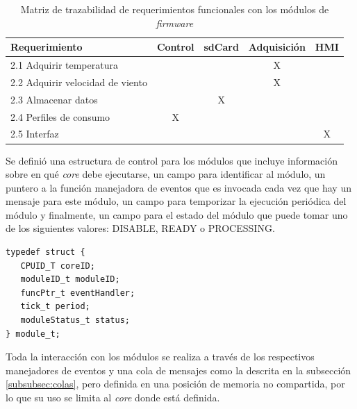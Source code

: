 \begin{table}[ht]
\caption[Matriz de trazabilidad de requerimientos funcionales]{Matriz de trazabilidad de requerimientos funcionales con los módulos de \textit{firmware}}
\label{tab:trazabilidad}
\begin{tabular}{lcccc}
\toprule
\textbf{Requerimiento} & \textbf{Control} & \textbf{sdCard} & \textbf{Adquisición} & \textbf{HMI} \\ \midrule
2.1 Adquirir temperatura                   &                  &                 & X                    &              \\ %
2.2 Adquirir velocidad de viento           &                  &                 & X                    &              \\ %
2.3 Almacenar datos                        &                  & X               &                      &              \\ %
2.4 Perfiles de consumo                    & X                &                 &                      &              \\ %
2.5 Interfaz                               &                  &                 &                      & X            \\ \bottomrule
\end{tabular}
\end{table}

Se definió una estructura de control para los módulos que incluye información sobre en qué \textit{core} debe ejecutarse, un campo para identificar al módulo, un puntero a la función manejadora de eventos que es invocada cada vez que hay un mensaje para este módulo, un campo para temporizar la ejecución periódica del módulo y finalmente, un campo para el estado del módulo que puede tomar uno de los siguientes valores: DISABLE, READY o PROCESSING.

\vspace{10px}

\begin{verbatim}
typedef struct {
   CPUID_T coreID;
   moduleID_t moduleID;
   funcPtr_t eventHandler;
   tick_t period;
   moduleStatus_t status;
} module_t;
\end{verbatim}

\vspace{10px}

Toda la interacción con los módulos se realiza a través de los respectivos manejadores de eventos y una cola de mensajes como la descrita en la subsección \ref{subsubsec:colas}, pero definida en una posición de memoria no compartida, por lo que su uso se limita al \textit{core} donde está definida.

